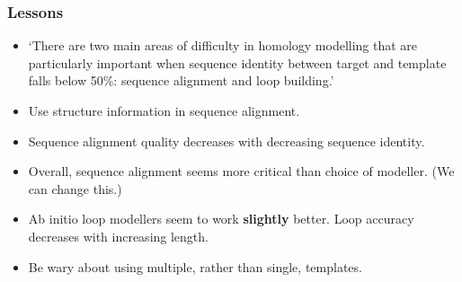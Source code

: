 \documentclass{beamer}
\begin{document}
\begin{frame}
\frametitle{Lessons}
\begin{itemize}
\item `There are two main areas of difficulty in homology modelling that are particularly important when sequence identity between target and template falls below 50\%: sequence alignment and loop building.' \cite{dalton07}
\item Use structure information in sequence alignment.
\item Sequence alignment quality decreases with decreasing sequence identity.
\item Overall, sequence alignment seems more critical than choice of modeller. (We can change this.)
\item Ab initio loop modellers seem to work \textbf{slightly} better. Loop accuracy decreases with increasing length.
\item Be wary about using multiple, rather than single, templates.
\end{itemize}
\end{frame}




\end{document}

